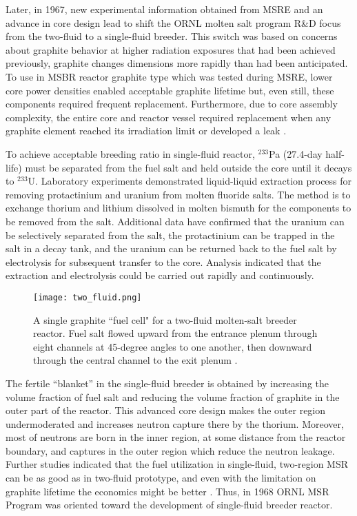 Later, in 1967, new experimental information obtained from \gls{MSRE} and an advance in core design lead to shift the \gls{ORNL} molten salt program R\&D focus from the two-fluid to a single-fluid breeder. This switch was based on concerns about graphite behavior at higher radiation exposures that had been achieved previously, graphite changes dimensions more rapidly than had been anticipated. To use in \gls{MSBR} reactor graphite type which was tested during \gls{MSRE}, lower core power densities enabled acceptable graphite lifetime but, even still, these components required frequent replacement. Furthermore, due to core assembly complexity, the entire core and reactor vessel required replacement when any graphite element reached its irradiation limit or developed a leak \cite{rosenthal_molten-salt_1970}.

To achieve acceptable breeding ratio in single-fluid reactor, $^{233}$Pa (27.4-day half-life) must be separated from the fuel salt and held outside the core until it decays to $^{233}$U. Laboratory experiments demonstrated liquid-liquid extraction process for removing protactinium and uranium from molten fluoride salts. The method is to exchange thorium and lithium dissolved in molten bismuth for the components to be removed from the salt. Additional data have confirmed that the uranium can be selectively separated from the salt, the protactinium can be trapped in the salt in a decay tank, and the uranium can be returned back to the fuel salt by electrolysis for subsequent transfer to the core. Analysis indicated that the extraction and electrolysis could be carried out rapidly and continuously.

\begin{figure}[htp!] %
  \centering
  \vspace{-0.3em}
  \texttt{[image: two\_fluid.png]}
  \caption{A single graphite ``fuel cell" for a two-fluid molten-salt breeder reactor. Fuel salt flowed upward from the entrance plenum through eight channels at 45-degree angles to one another, then downward through the central channel to the exit plenum \cite{briggs_molten-salt_1966}.}
  \vspace{-0.6em}
  \label{fig:two_fluid}
\end{figure}
\FloatBarrier

The fertile ``blanket'' in the single-fluid breeder is obtained by increasing the volume fraction of fuel salt and reducing the volume fraction of graphite in the outer part of the reactor. This advanced core design makes the outer region undermoderated and increases neutron capture there by the thorium. Moreover, most of neutrons are born in the inner region, at some distance from the reactor boundary, and captures in the outer region which reduce the neutron leakage. Further studies indicated that the fuel utilization in single-fluid, two-region \gls{MSR} can be as good as in two-fluid prototype, and even with the limitation on graphite lifetime the economics might be better \cite{rosenthal_molten-salt_1970}. Thus, in 1968 \gls{ORNL} \gls{MSR} Program was oriented toward the development of single-fluid breeder reactor.

